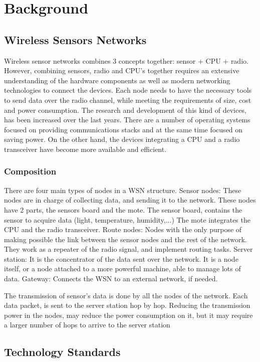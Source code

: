 \section{Background}

\subsection{Wireless Sensors Networks}
Wireless sensor networks combines 3 concepts together:
	sensor + CPU + radio.
However,
	combining sensors,
	radio and CPU's together requires an extensive understanding of the hardware components as well as modern networking technologies to connect the devices.
Each node needs to have the necessary tools to send data over the radio channel,
	while meeting the requirements of size,
	cost and power consumption.
The research and development of this kind of devices,
	has been increased over the last years.
There are a number of operating systems focused on providing communications stacks and at the same time focused on saving power.
On the other hand,
	the devices integrating a CPU and a radio transceiver have become more available and efficient.

\subsubsection{Composition}
There are four main types of nodes in a WSN structure.
Sensor nodes:
	These nodes are in charge of collecting data,
	and sending it to the network.
These nodes have 2 parts,
	the sensors board and the mote.
The sensor board,
	contains the sensor to acquire data (light,
	temperature,
	humidity,...) The mote integrates the CPU and the radio transceiver.
Route nodes:
	Nodes with the only purpose of making possible the link between the sensor nodes and the rest of the network.
They work as a repeater of the radio signal,
	and implement routing tasks.
Server station:
	It is the concentrator of the data sent over the network.
It is a node itself,
	or a node attached to a more powerful machine,
	able to manage lots of data.
Gateway:
	Connects the WSN to an external network,
	if needed.

The transmission of sensor's data is done by all the nodes of the network.
Each data packet,
	is sent to the server station hop by hop.
Reducing the transmission power in the nodes,
	may reduce the power consumption on it,
	but it may require a larger number of hops to arrive to the server station 

\subsection{Technology Standards}

